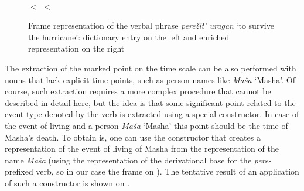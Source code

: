 \begin{figure}
\begin{minipage}{0.7\textwidth}\centering
{}
\end{minipage}\hfill%
\begin{minipage}{0.3\textwidth}\centering
{}\\
 $<$  $<$ \\
\end{minipage}
\caption{Frame representation of the verbal phrase \textit{pere\v{z}it' uragan} `to survive the hurricane': dictionary entry on the left and enriched representation on the right \label{frame:outlive:hurricane}}
\end{figure}

The extraction of the marked point on the time scale can be also performed with nouns that lack explicit time points, such as person names like \textit{Ma\v{s}a} `Masha'. Of course, such extraction requires a more complex procedure that cannot be described in detail here, but the idea is that some significant point related to the event type denoted by the verb is extracted using a special constructor. In case of the event of living and a person \textit{Ma\v{s}a} `Masha' this point should be the time of Masha's death. To obtain is, one can use the constructor that creates a representation of the event of living of Masha from the representation of the name \textit{Ma\v{s}a} (using the representation of the derivational base for the \textit{pere-}  prefixed verb, so in our case the frame on ). The tentative result of an application of such a constructor is shown on .

